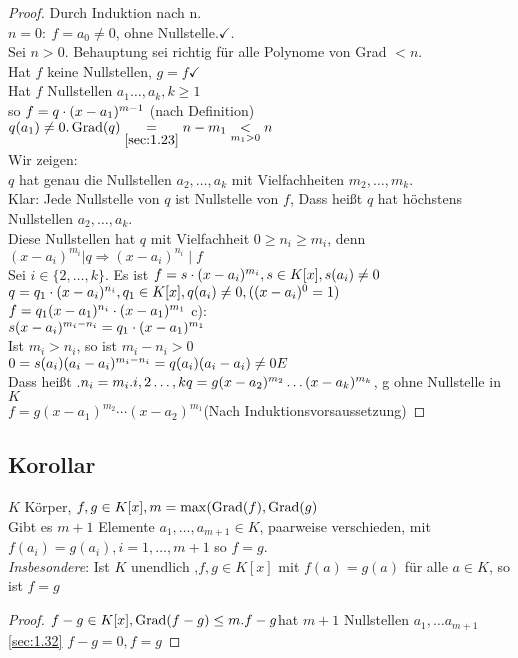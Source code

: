 \begin{proof}
Durch Induktion nach n.\\
$n = 0:\: f = a_0 \ne 0$, ohne Nullstelle.$\checkmark$.\\
Sei $n > 0$. Behauptung sei richtig für alle Polynome von Grad $<n$.\\
Hat $f$ keine Nullstellen, $g=f\checkmark$\\
Hat $f$ Nullstellen $a_1\ldots,a_k, k \geq 1$\\
so $f = q \cdot (x-a_1)^{m-1}$ (nach Definition)
$q(a_1) \ne 0.\\
\operatorname{Grad}(q) \underset{\ref{sec:1.23}}{=}n-m_1 \underset{m_1 > 0}{<} n$\\
Wir zeigen:\\
$q$ hat genau die Nullstellen $a_2,\ldots,a_k$ mit Vielfachheiten $m_2,\ldots,m_k$.\\
Klar: Jede Nullstelle von $q$ ist Nullstelle von $f$, Dass hei\ss t $q$ hat höchstens Nullstellen $a_2,\ldots,a_k$.\\
Diese Nullstellen hat $q$ mit Vielfachheit $0 \geq n_i \geq m_i$, denn $(x-a_i)^{m_i} \vert q \Rightarrow (x-a_i)^{n_i}\mid f$\\
Sei $i \in \{2,\ldots,k\}.$ Es ist $f = s \cdot (x - a_i)^{m_i}, s \in K[x], s(a_i) \ne 0\\$
$q = q_1 \cd (x-a_i)^{n_i},q_1 \in K[x], q(a_i) \ne 0,\hfill ((x-a_i)^0 =1 ) $
$f=q_1(x-a_1)^{n_i} \cdot (x-a_1)^{m_1}$
c):\\
$s(x-a_i)^{m_i-n_i} =q_1 \cdot (x-a_1)^{m_1}$\\
Ist $m_i > n_i$, so ist $m_i - n_i > 0$\\
$0 = s(a_i)(a_i -a_i)^{m_i - n_i} = q(a_i)(a_i - a_i) \ne 0 \Lightning$\\
Dass hei\ss t .$n_i = m_i. i,2\ldots,k\\
q = g (x-a_2)^{m_2}\ldots (x-a_k)^{m_k}$, g ohne Nullstelle in $K$\\
$f = g (x-a_1)^{m_2} \cdots (x-a_2)^{m_1}$\hfill (Nach Induktionsvorsaussetzung)
\end{proof}
\subsection{Korollar}\label{sec:1.33}
$K$ Körper, $f,g \in K[x], m = \max(\operatorname{Grad}(f),\operatorname{Grad}(g)$\\
Gibt es $m+1$ Elemente $a_1,\ldots,a_{m+1} \in K$, paarweise verschieden, mit $f(a_i) = g(a_i), i = 1,\ldots,m+1$ so $f = g$.\\
\emph{Insbesondere}: Ist $K$ unendlich ,$f,g \in K[x]$ mit $f(a) = g(a)$ für alle $a \in K$, so ist $f =g$\\
\begin{proof}
$f -g \in K[x], \operatorname{Grad}(f-g) \leq m.\\
f -g $hat $m+1$ Nullstellen $a_1,\ldots a_{m+1}$\\
\ref{sec:1.32} $f - g = 0, f =g$
\end{proof}

